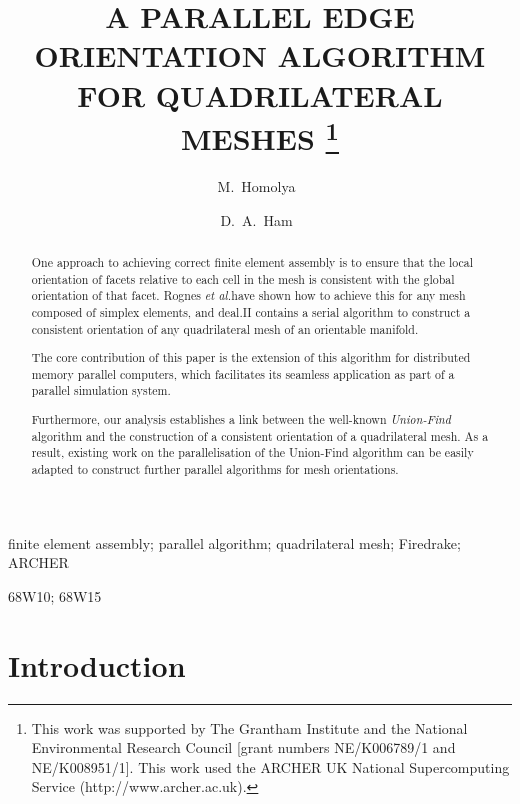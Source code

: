 \documentclass[oneeqnum,onethmnum,onefignum,onetabnum]{siamltex1213}
\title{A PARALLEL EDGE ORIENTATION ALGORITHM FOR QUADRILATERAL MESHES
\thanks{This work was supported by The Grantham Institute and the National Environmental Research Council [grant
numbers NE/K006789/1 and NE/K008951/1].
This work used the ARCHER UK National Supercomputing Service (http://www.archer.ac.uk).}}
\author{M.~Homolya\footnotemark[2]\ \footnotemark[3]
\and D.~A.~Ham\footnotemark[3]\ \footnotemark[4]}
\begin{document}
\maketitle

\renewcommand{\thefootnote}{\fnsymbol{footnote}}


\renewcommand{\thefootnote}{\arabic{footnote}}


\begin{abstract}
One approach to achieving correct finite element assembly is to ensure
that the local orientation of facets relative to each cell in the mesh
is consistent with the global orientation of that facet.
Rognes \textsl{et al.}\@ have shown how to achieve this for any mesh
composed of simplex elements, and deal.II contains
a serial algorithm to construct a consistent orientation of any
quadrilateral mesh of an orientable manifold.

The core contribution of this paper is the extension of this algorithm
for distributed memory parallel computers, which facilitates its seamless
application as part of a parallel simulation system.

Furthermore, our analysis establishes a link between the
well-known \emph{Union-Find} algorithm and the construction of a
consistent orientation of a quadrilateral mesh.
As a result, existing work on the parallelisation of the Union-Find
algorithm can be easily adapted to construct further parallel algorithms
for mesh orientations.
\end{abstract}

\begin{keywords}
finite element assembly;
parallel algorithm;
quadrilateral mesh;
Firedrake;
ARCHER
\end{keywords}

\begin{AMS}
68W10; 68W15
\end{AMS}

\pagestyle{myheadings}
\thispagestyle{plain}


\section{Introduction}
\end{document}
